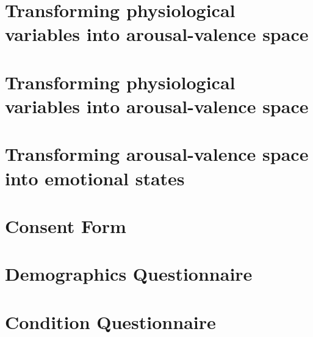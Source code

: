 \documentclass{uofsthesis-cs}
\begin{document}


\uofsappendix
\chapter{Transforming physiological variables into arousal-valence space} \label{app:phys-to-av}    
\chapter{Transforming physiological variables into arousal-valence space} \label{app:phys-to-av}    
\chapter{Transforming arousal-valence space into emotional states}        \label{app:av-to-emotion} 
\chapter{Consent Form}                                                    \label{app:consent}       \addtolength{\wpYoffset}{-1.6cm}
\chapter{Demographics Questionnaire}                                      \label{app:q-dmg}         \noindent{}\newpage
                                                                                                    \noindent{}\newpage
                                                                                                    \noindent{}
\chapter{Condition Questionnaire}                                         \label{app:q-cnd}         \noindent{}
\end{document}
